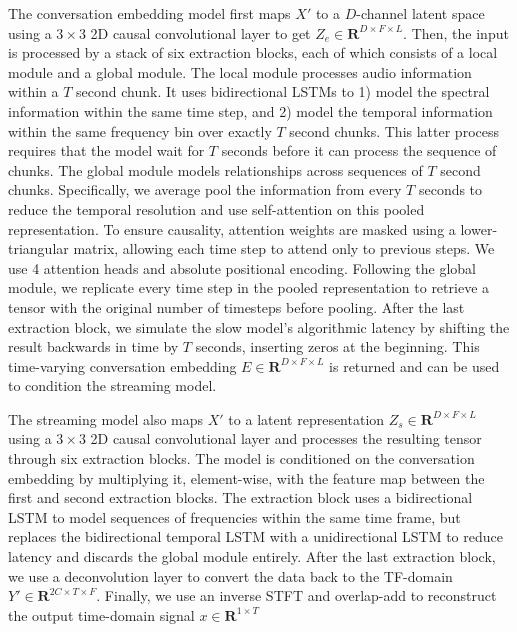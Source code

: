 The conversation embedding model first maps $X'$ to a $D$-channel latent space using a $3\times3$ 2D causal convolutional layer to get $Z_e \in \mathbf{R}^{D \times F \times L}$. Then, the input is processed by a stack of six extraction blocks, each of which consists of a local module and a global module. The local module processes audio information within a $T$ second chunk. It uses bidirectional LSTMs to 1) model the spectral information within the same time step, and 2) model the temporal information within the same frequency bin over exactly $T$ second chunks. This latter process requires that the model wait for $T$ seconds before it can process the sequence of chunks. The global module models relationships across sequences of $T$ second chunks. Specifically, we average pool the information from every $T$ seconds to reduce the temporal resolution and use self-attention on this pooled representation. To ensure causality, attention weights are masked using a lower-triangular matrix, allowing each time step to attend only to previous steps. We use 4 attention heads and absolute positional encoding. Following the global module, we replicate every time step in the pooled representation to retrieve a tensor with the original number of timesteps before pooling. After the last extraction block, we simulate the slow model's algorithmic latency by shifting the result backwards in time by $T$ seconds, inserting zeros at the beginning. This time-varying conversation embedding $E \in \mathbf{R}^{D \times F \times L }$ is returned and can be used to condition the streaming model.

The streaming model also maps $X'$ to a latent representation $Z_s \in \mathbf{R}^{D \times F \times L}$ using a $3\times3$ 2D causal convolutional layer and processes the resulting tensor through six extraction blocks. The model is conditioned on the conversation embedding by multiplying it, element-wise, with the feature map between the first and second extraction blocks. The extraction block uses a bidirectional LSTM to model sequences of frequencies within the same time frame, but replaces the bidirectional temporal LSTM with a unidirectional LSTM to reduce latency and discards the global module entirely. After the last extraction block, we use a deconvolution layer to convert the data back to the TF-domain $Y'\in \mathbf{R}^{2C \times T \times F}$. Finally, we use an inverse STFT and overlap-add to reconstruct the output time-domain signal $x \in \mathbf{R}^{1 \times T}$


